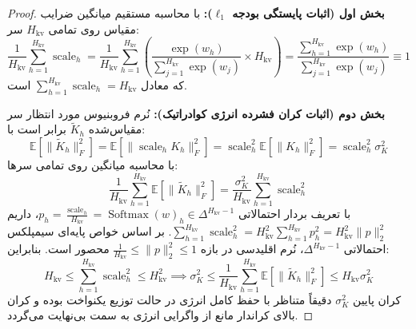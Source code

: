 \documentclass[12pt,a4paper]{report}
\theoremstyle{definition}
\begin{document}
\begin{proof}
\textbf{بخش اول (اثبات پایستگی بودجه $\ell_1$):}
با محاسبه مستقیم میانگین ضرایب مقیاس روی تمامی $H_{\text{kv}}$ سر:
\begin{equation}
    \frac{1}{H_{\text{kv}}} \sum_{h=1}^{H_{\text{kv}}} \operatorname{scale}_h = \frac{1}{H_{\text{kv}}} \sum_{h=1}^{H_{\text{kv}}} \left( \frac{\exp(w_h)}{\sum_{j=1}^{H_{\text{kv}}} \exp(w_j)} \times H_{\text{kv}} \right) = \frac{\sum_{h=1}^{H_{\text{kv}}} \exp(w_h)}{\sum_{j=1}^{H_{\text{kv}}} \exp(w_j)} \equiv 1
\end{equation}
که معادل $\sum_{h=1}^{H_{\text{kv}}} \operatorname{scale}_h = H_{\text{kv}}$ است.

\textbf{بخش دوم (اثبات کران فشرده انرژی کوادراتیک):}
نُرم فروبنیوس مورد انتظار سر مقیاس‌شده $\tilde{K}_h$ برابر است با:
\begin{equation}
    \mathbb{E}[\|\tilde{K}_h\|_F^2] = \mathbb{E}[\|\operatorname{scale}_h K_h\|_F^2] = \operatorname{scale}_h^2 \mathbb{E}[\|K_h\|_F^2] = \operatorname{scale}_h^2 \sigma_K^2
\end{equation}
با محاسبه میانگین روی تمامی سرها:
\begin{equation}
    \frac{1}{H_{\text{kv}}} \sum_{h=1}^{H_{\text{kv}}} \mathbb{E}[\|\tilde{K}_h\|_F^2] = \frac{\sigma_K^2}{H_{\text{kv}}} \sum_{h=1}^{H_{\text{kv}}} \operatorname{scale}_h^2
\end{equation}
با تعریف بردار احتمالاتی $p_h = \frac{\operatorname{scale}_h}{H_{\text{kv}}} = \operatorname{Softmax}(w)_h \in \Delta^{H_{\text{kv}}-1}$، داریم $\sum_{h=1}^{H_{\text{kv}}} \operatorname{scale}_h^2 = H_{\text{kv}}^2 \sum_{h=1}^{H_{\text{kv}}} p_h^2 = H_{\text{kv}}^2 \|p\|_2^2$. بر اساس خواص پایه‌ای سیمپلکس احتمالاتی $\Delta^{H_{\text{kv}}-1}$، نُرم اقلیدسی در بازه $\frac{1}{H_{\text{kv}}} \le \|p\|_2^2 \le 1$ محصور است. بنابراین:
\begin{equation}
    H_{\text{kv}} \le \sum_{h=1}^{H_{\text{kv}}} \operatorname{scale}_h^2 \le H_{\text{kv}}^2 \implies \sigma_K^2 \le \frac{1}{H_{\text{kv}}} \sum_{h=1}^{H_{\text{kv}}} \mathbb{E}\left[\|\tilde{K}_h\|_F^2\right] \le H_{\text{kv}} \sigma_K^2
\end{equation}
کران پایین $\sigma_K^2$ دقیقاً متناظر با حفظ کامل انرژی در حالت توزیع یکنواخت بوده و کران بالای کراندار مانع از واگرایی انرژی به سمت بی‌نهایت می‌گردد.


\end{proof}
\end{document}
